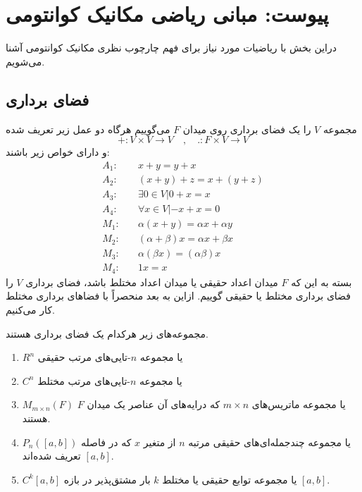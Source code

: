 \section{پیوست: مبانی ریاضی مکانیک کوانتومی}\label{chapter7}
دراین بخش با ریاضیات مورد نیاز برای فهم چارچوب نظری مکانیک کوانتومی آشنا می‌شویم.
  \subsection{فضای برداری}
  مجموعه $V$ را یک فضای برداری روی میدان $F$ می‌گوییم هرگاه دو عمل زیر تعریف شده 
  \begin{equation}
  	+ : V \times V \rightarrow V \quad , \quad . : F \times V \rightarrow V
  \end{equation}
  و دارای خواص زیر باشند: 
   \begin{equation}
   \begin{split}
   A_{1}: & \quad x + y = y + x\\
   A_{2}: & \quad (x + y) + z = x + (y + z)\\
   A_{3}: & \quad \exists 0 \in V | 0 + x = x\\
   A_{4}: & \quad \forall x \in V | -x + x = 0\\
   M_{1}: & \quad \alpha(x+y) = \alpha x + \alpha y\\
   M_{2}: & \quad (\alpha + \beta)x = \alpha x + \beta x\\
   M_{3}: & \quad \alpha(\beta x) = (\alpha\beta) x\\
   M_{4}: & \quad 1x = x
   \end{split}
   \end{equation}
   بسته به این که $F$ میدان اعداد حقیقی یا میدان اعداد مختلط باشد، فضای برداری $V$ را فضای برداری مختلط یا حقیقی گوییم. ازاین به بعد منحصراً با فضاهای برداری مختلط کار می‌کنیم. 
   
\begin{example}
مجموعه‌های زیر هرکدام یک فضای برداری هستند. 
\begin{enumerate}
	\item $R^{n}$ یا مجموعه $n$-تایی‌های مرتب حقیقی
	\item $C^{n}$ یا مجموعه $n$-تایی‌های مرتب مختلط
	\item $M_{m \times n}(F)$ یا مجموعه ماتریس‌های $m \times n$ که درایه‌های آن عناصر یک میدان $F$ هستند.
	\item $P_{n}([a,b])$ یا مجموعه چندجمله‌ای‌های حقیقی مرتبه $n$ از متغیر $x$ که در فاصله $[a,b]$ تعریف شده‌اند. 
	\item $C^{k}[a,b]$ یا مجموعه توابع حقیقی یا مختلط $k$ بار مشتق‌پذیر در بازه $[a,b]$.
\end{enumerate}  
\end{example} 
   
